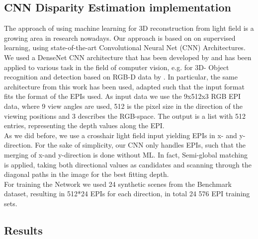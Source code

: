\documentclass  [
  paper    = a4,
  BCOR     = 10mm,
  twoside,
  fontsize = 12pt,
  fleqn,
  toc      = bibnumbered,
  toc      = listofnumbered,
  numbers  = noendperiod,
  headings = normal,
  listof   = leveldown,
  version  = 3.03
]                                       {scrreprt}
\begin{document}
\begin{appendix}
\chapter{CNN Disparity Estimation implementation}
The approach of using machine learning for 3D reconstruction from light field is a growing area in research nowadays. Our approach is based on on supervised learning, using state-of-the-art Convolutional Neural Net (CNN) Architectures.
We used a DenseNet CNN architecture that has been developed by \cite{huang2017densely} and has been applied to various task in the field of computer vision, e.g. for 3D- Object recognition and detection based on RGB-D data by \cite{wolf2018object}. In particular, the same architecture from this work has been used, adapted such that the input format fits the format of the EPIs used. As input data we use the 9x512x3 RGB EPI data, where 9 view angles are used, 512 is the pixel size in the direction of the viewing positions and 3 describes the RGB-space. The output is a list with 512 entries, representing the depth values along the EPI. \\
As we did before, we use a crosshair light field input yielding EPIs in x- and y-direction. For the sake of simplicity, our CNN only handles EPIs, such that the merging of x-and y-direction is done without ML. In fact, Semi-global matching is applied, taking both directional values as candidates and scanning through the diagonal paths in the image for the best fitting depth.\\
For training the Network we used 24 synthetic scenes from the \cite{hci_benchmark} Benchmark dataset, resulting in 512*24 EPIs for each direction, in total 24 576 EPI training sets.

\section*{Results}


\end{appendix}
\end{document}
